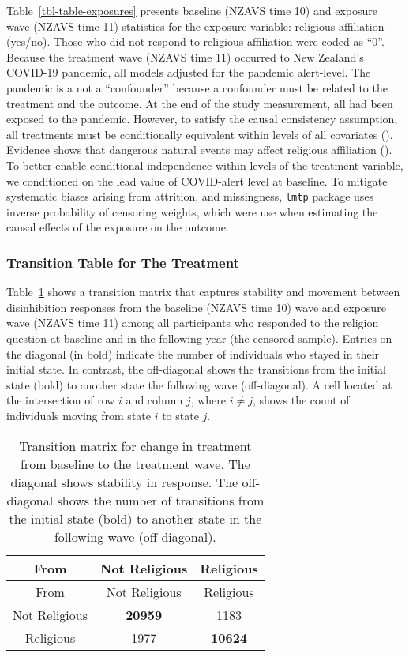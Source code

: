 \documentclass[
  singlecolumn]{article}
\begin{document}
Table~\ref{tbl-table-exposures} presents baseline (NZAVS time 10) and
exposure wave (NZAVS time 11) statistics for the exposure variable:
religious affiliation (yes/no). Those who did not respond to religious
affiliation were coded as ``0''. Because the treatment wave (NZAVS time
11) occurred to New Zealand's COVID-19 pandemic, all models adjusted for
the pandemic alert-level. The pandemic is a not a ``confounder'' because
a confounder must be related to the treatment and the outcome. At the
end of the study measurement, all had been exposed to the pandemic.
However, to satisfy the causal consistency assumption, all treatments
must be conditionally equivalent within levels of all covariates
(). Evidence
shows that dangerous natural events may affect religious affiliation
(). To better enable conditional
independence within levels of the treatment variable, we conditioned on
the lead value of COVID-alert level at baseline. To mitigate systematic
biases arising from attrition, and missingness, \texttt{lmtp} package
uses inverse probability of censoring weights, which were use when
estimating the causal effects of the exposure on the outcome.

\subsubsection{Transition Table for The
Treatment}\label{transition-table-for-the-treatment}

Table~\ref{tbl-transition} shows a transition matrix that captures
stability and movement between disinhibition responses from the baseline
(NZAVS time 10) wave and exposure wave (NZAVS time 11) among all
participants who responded to the religion question at baseline and in
the following year (the censored sample). Entries on the diagonal (in
bold) indicate the number of individuals who stayed in their initial
state. In contrast, the off-diagonal shows the transitions from the
initial state (bold) to another state the following wave (off-diagonal).
A cell located at the intersection of row \(i\) and column \(j\), where
\(i \neq j\), shows the count of individuals moving from state \(i\) to
state \(j\).

\begin{longtable}[]{@{}ccc@{}}
\caption{Transition matrix for change in treatment from baseline to the
treatment wave. The diagonal shows stability in response. The
off-diagonal shows the number of transitions from the initial state
(bold) to another state in the following wave
(off-diagonal).}\label{tbl-transition}\tabularnewline
\toprule\noalign{}
From & Not Religious & Religious \\
\midrule\noalign{}
\endfirsthead
\toprule\noalign{}
From & Not Religious & Religious \\
\midrule\noalign{}
\endhead
\bottomrule\noalign{}
\endlastfoot
Not Religious & \textbf{20959} & 1183 \\
Religious & 1977 & \textbf{10624} \\
\end{longtable}
\end{document}
